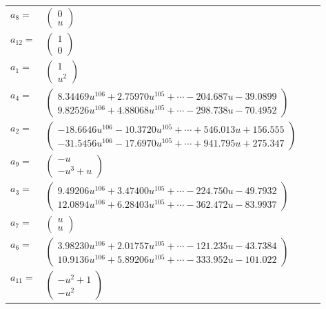 \documentclass[1p]{elsarticle_modified}
\theoremstyle{definition}
\begin{document}
\begin{tabular}{m{7pt} m{180pt} m{7pt} m{180pt} }
\flushright $a_{8}=$&$\begin{pmatrix}0\\u\end{pmatrix}$ \\
\flushright $a_{12}=$&$\begin{pmatrix}1\\0\end{pmatrix}$ \\
\flushright $a_{1}=$&$\begin{pmatrix}1\\u^2\end{pmatrix}$ \\
\flushright $a_{4}=$&$\begin{pmatrix}8.34469 u^{106}+2.75970 u^{105}+\cdots-204.687 u-39.0899\\9.82526 u^{106}+4.88068 u^{105}+\cdots-298.738 u-70.4952\end{pmatrix}$ \\
\flushright $a_{2}=$&$\begin{pmatrix}-18.6646 u^{106}-10.3720 u^{105}+\cdots+546.013 u+156.555\\-31.5456 u^{106}-17.6970 u^{105}+\cdots+941.795 u+275.347\end{pmatrix}$ \\
\flushright $a_{9}=$&$\begin{pmatrix}- u\\- u^3+u\end{pmatrix}$ \\
\flushright $a_{3}=$&$\begin{pmatrix}9.49206 u^{106}+3.47400 u^{105}+\cdots-224.750 u-49.7932\\12.0894 u^{106}+6.28403 u^{105}+\cdots-362.472 u-83.9937\end{pmatrix}$ \\
\flushright $a_{7}=$&$\begin{pmatrix}u\\u\end{pmatrix}$ \\
\flushright $a_{6}=$&$\begin{pmatrix}3.98230 u^{106}+2.01757 u^{105}+\cdots-121.235 u-43.7384\\10.9136 u^{106}+5.89206 u^{105}+\cdots-333.952 u-101.022\end{pmatrix}$ \\
\flushright $a_{11}=$&$\begin{pmatrix}- u^2+1\\- u^2\end{pmatrix}$ \\

\end{tabular}
\end{document}
